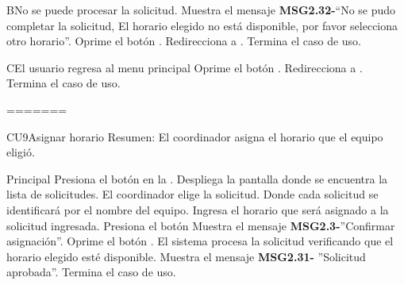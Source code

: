 \begin{UCtrayectoriaA}{B}{No se puede procesar la solicitud.}
	\UCpaso Muestra el mensaje {\bf MSG2.32-}``No se pudo completar la solicitud, El horario elegido no está disponible, por favor selecciona otro horario''.
	\UCpaso[\UCactor] Oprime el botón .
	\UCpaso Redirecciona a .
	\UCpaso Termina el caso de uso.
	\end{UCtrayectoriaA}
		
\begin{UCtrayectoriaA}{C}{El usuario regresa al menu principal}
	\UCpaso[\UCactor] Oprime el botón .
	\UCpaso Redirecciona a .
	\UCpaso Termina el caso de uso.
	\end{UCtrayectoriaA}
	
=======



	\begin{UseCase}{CU9}{Asignar horario}{
		Resumen: El coordinador asigna el horario que el equipo eligió.}
		
	\end{UseCase}
	\newpage
	
	
	\begin{UCtrayectoria}{Principal}
	\UCpaso[\UCactor] Presiona el botón  en la . 
	\UCpaso Despliega la pantalla  donde se encuentra la lista de solicitudes. 
	\UCpaso[\UCactor] El coordinador elige la solicitud. Donde cada solicitud se identificará por el nombre del equipo.
	\UCpaso[\UCactor] Ingresa el horario que será asignado a la solicitud ingresada.
	\UCpaso[\UCactor] Presiona el botón 
	\UCpaso Muestra el mensaje {\bf MSG2.3-}''Confirmar asignación''.
	\UCpaso[\UCactor] Oprime el botón .	
	\UCpaso El sistema procesa la solicitud verificando que el horario elegido esté disponible.
	\UCpaso Muestra el mensaje {\bf MSG2.31-} ''Solicitud aprobada''.  
	\UCpaso[] Termina el caso de uso.   
\end{UCtrayectoria}

